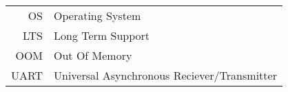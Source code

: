 


\begin{center}
\label{abbrv}
\begin{tabular}{r l}
	OS & Operating System \\
	LTS & Long Term Support \\
	OOM & Out Of Memory \\
	UART & Universal Asynchronous Reciever/Transmitter
\end{tabular}
\end{center}


\newpage

